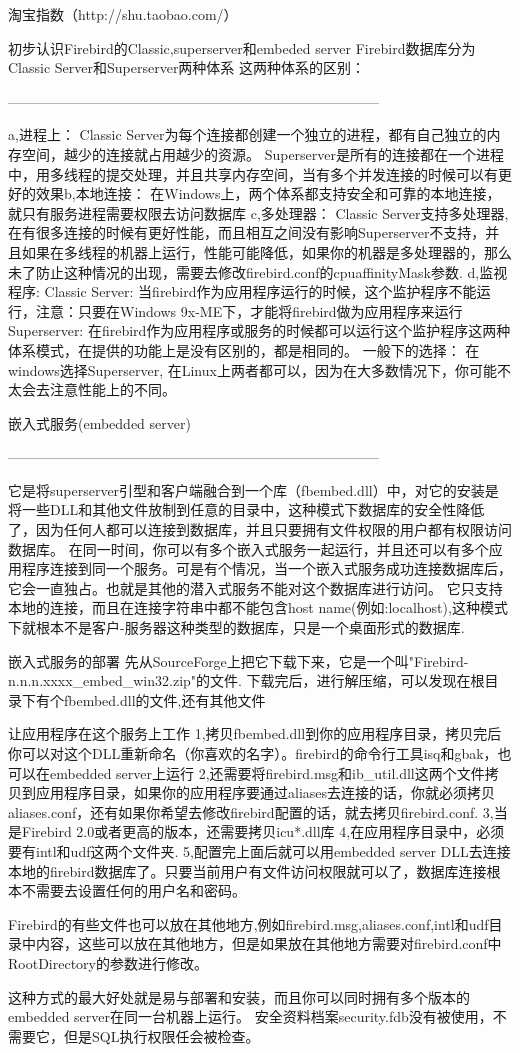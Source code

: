 淘宝指数（http://shu.taobao.com/）


初步认识Firebird的Classic,superserver和embeded server
Firebird数据库分为Classic Server和Superserver两种体系
这两种体系的区别： 

--------------------------------------------------------------------------------

a,进程上：
   Classic Server为每个连接都创建一个独立的进程，都有自己独立的内存空间，越少的连接就占用越少的资源。
    Superserver是所有的连接都在一个进程中，用多线程的提交处理，并且共享内存空间，当有多个并发连接的时候可以有更好的效果b,本地连接：
     在Windows上，两个体系都支持安全和可靠的本地连接，就只有服务进程需要权限去访问数据库
c,多处理器：
     Classic Server支持多处理器,在有很多连接的时候有更好性能，而且相互之间没有影响Superserver不支持，并且如果在多线程的机器上运行，性能可能降低，如果你的机器是多处理器的，那么未了防止这种情况的出现，需要去修改firebird.conf的cpuaffinityMask参数.
d,监视程序:
     Classic Server: 当firebird作为应用程序运行的时候，这个监护程序不能运行，注意：只要在Windows 
9x-ME下，才能将firebird做为应用程序来运行
     Superserver:  在firebird作为应用程序或服务的时候都可以运行这个监护程序这两种体系模式，在提供的功能上是没有区别的，都是相同的。
一般下的选择：
在windows选择Superserver,
在Linux上两者都可以，因为在大多数情况下，你可能不太会去注意性能上的不同。

嵌入式服务(embedded server) 


--------------------------------------------------------------------------------

     它是将superserver引型和客户端融合到一个库（fbembed.dll）中，对它的安装是将一些DLL和其他文件放制到任意的目录中，这种模式下数据库的安全性降低了，因为任何人都可以连接到数据库，并且只要拥有文件权限的用户都有权限访问数据库。
在同一时间，你可以有多个嵌入式服务一起运行，并且还可以有多个应用程序连接到同一个服务。可是有个情况，当一个嵌入式服务成功连接数据库后，它会一直独占。也就是其他的潜入式服务不能对这个数据库进行访问。
它只支持本地的连接，而且在连接字符串中都不能包含host 
name(例如:localhost),这种模式下就根本不是客户-服务器这种类型的数据库，只是一个桌面形式的数据库.
 


嵌入式服务的部署
     先从SourceForge上把它下载下来，它是一个叫"Firebird-n.n.n.xxxx_embed_win32.zip"的文件.
下载完后，进行解压缩，可以发现在根目录下有个fbembed.dll的文件,还有其他文件


让应用程序在这个服务上工作
1,拷贝fbembed.dll到你的应用程序目录，拷贝完后你可以对这个DLL重新命名（你喜欢的名字）。firebird的命令行工具isq和gbak，也可以在embedded 
server上运行
2,还需要将firebird.msg和ib_util.dll这两个文件拷贝到应用程序目录，如果你的应用程序要通过aliases去连接的话，你就必须拷贝aliases.conf，还有如果你希望去修改firebird配置的话，就去拷贝firebird.conf.
3,当是Firebird 
2.0或者更高的版本，还需要拷贝icu*.dll库
4,在应用程序目录中，必须要有intl和udf这两个文件夹.
5,配置完上面后就可以用embedded 
server 
DLL去连接本地的firebird数据库了。只要当前用户有文件访问权限就可以了，数据库连接根本不需要去设置任何的用户名和密码。


     Firebird的有些文件也可以放在其他地方,例如firebird.msg,aliases.conf,intl和udf目录中内容，这些可以放在其他地方，但是如果放在其他地方需要对firebird.conf中RootDirectory的参数进行修改。


     这种方式的最大好处就是易与部署和安装，而且你可以同时拥有多个版本的embedded 
server在同一台机器上运行。
安全资料档案security.fdb没有被使用，不需要它，但是SQL执行权限任会被检查。



